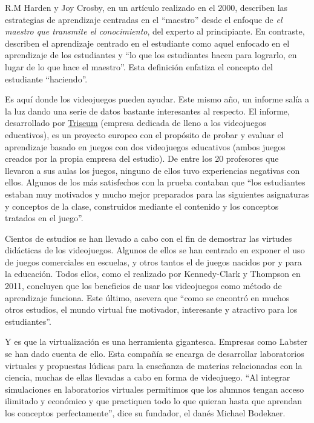 R.M Harden y Joy Crosby, en un artículo realizado en el 2000, describen las estrategias de aprendizaje centradas en el ``maestro'' desde el enfoque de \textit{el maestro que transmite el conocimiento}, del experto al principiante. En contraste, describen el aprendizaje centrado en el estudiante como aquel enfocado en el aprendizaje de los estudiantes y ``lo que los estudiantes hacen para lograrlo, en lugar de lo que hace el maestro''. Esta definición enfatiza el concepto del estudiante ``haciendo''\cite{goodteacher}.

Es aquí donde los videojuegos pueden ayudar. Este mismo año, un informe salía a la luz dando una serie de datos bastante interesantes al respecto. El informe, desarrollado por \href{https://triseum.com/}{Triseum} (empresa dedicada de lleno a los videojuegos educativos), es un proyecto europeo con el propósito de probar y evaluar el aprendizaje basado en juegos con dos videojuegos educativos (ambos juegos creados por la propia empresa del estudio). De entre los 20 profesores que llevaron a sus aulas los juegos, ninguno de ellos tuvo experiencias negativas con ellos. Algunos de los más satisfechos con la prueba contaban que ``los estudiantes estaban muy motivados y mucho mejor preparados para las siguientes asignaturas y conceptos de la clase, construidos mediante el contenido y los conceptos tratados en el juego''\cite{triseum}.

Cientos de estudios se han llevado a cabo con el fin de demostrar las virtudes didácticas de los videojuegos. Algunos de ellos se han centrado en exponer el uso de juegos comerciales en escuelas\cite{gamesinclass}, y otros tantos  el de juegos nacidos por y para la educación\cite{edugamesinclass}. Todos ellos, como el realizado por Kennedy-Clark y Thompson en 2011, concluyen que los beneficios de usar los videojuegos como método de aprendizaje funciona. Este último, asevera que ``como se encontró en muchos otros estudios, el mundo virtual fue motivador, interesante y atractivo para los estudiantes''\cite{deathrome}.

Y es que la virtualización es una herramienta gigantesca. Empresas como Labster se han dado cuenta de ello. Esta compañía se encarga de desarrollar laboratorios virtuales y propuestas lúdicas para la enseñanza de materias relacionadas con la ciencia, muchas de ellas llevadas a cabo en forma de videojuego\cite{labster}. ``Al integrar simulaciones en laboratorios virtuales permitimos que los alumnos tengan acceso ilimitado y económico y que practiquen todo lo que quieran hasta que aprendan los conceptos perfectamente'', dice su fundador, el danés Michael Bodekaer.	

